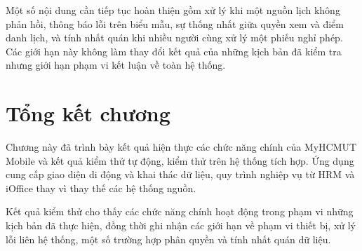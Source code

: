 Một số nội dung cần tiếp tục hoàn thiện gồm xử lý khi một nguồn lịch không phản hồi, thông báo lỗi trên biểu mẫu, sự thống nhất giữa quyền xem và điểm danh lịch, và tính nhất quán khi nhiều người cùng xử lý một phiếu nghỉ phép. Các giới hạn này không làm thay đổi kết quả của những kịch bản đã kiểm tra nhưng giới hạn phạm vi kết luận về toàn hệ thống.

\section{Tổng kết chương}
\label{sec:tomtat_chuong}

Chương này đã trình bày kết quả hiện thực các chức năng chính của MyHCMUT Mobile và kết quả kiểm thử tự động, kiểm thử trên hệ thống tích hợp. Ứng dụng cung cấp giao diện di động và khai thác dữ liệu, quy trình nghiệp vụ từ HRM và iOffice thay vì thay thế các hệ thống nguồn.

Kết quả kiểm thử cho thấy các chức năng chính hoạt động trong phạm vi những kịch bản đã thực hiện, đồng thời ghi nhận các giới hạn về phạm vi thiết bị, xử lý lỗi liên hệ thống, một số trường hợp phân quyền và tính nhất quán dữ liệu.
